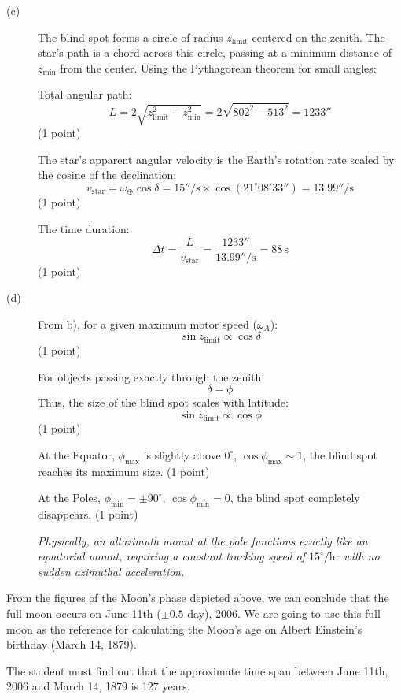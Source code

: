 \begin{description}
\item[(c)] The blind spot forms a circle of radius $z_{\mathrm{limit}}$
  centered on the zenith. The star's path is a chord across this circle,
  passing at a minimum distance of $z_{\mathrm{min}}$ from the center. Using
  the Pythagorean theorem for small angles:

  Total angular path:
  \[ L = 2\sqrt{z_{\mathrm{limit}}^2 - z_{\mathrm{min}}^2}
       = 2\sqrt{802^2 - 513^2} = 1233'' \]
  \hfill(1 point)

  The star's apparent angular velocity is the Earth's rotation rate scaled by
  the cosine of the declination:
  \[ v_{\mathrm{star}} = \omega_\oplus \cos\delta
     = 15''/\mathrm{s} \times \cos(21^\circ 08' 33'') = 13.99''/\mathrm{s} \]
  \hfill(1 point)

  The time duration:
  \[ \Delta t = \frac{L}{v_{\mathrm{star}}}
     = \frac{1233''}{13.99''/\mathrm{s}} = 88\,\mathrm{s} \]
  \hfill(1 point)

\item[(d)] From b), for a given maximum motor speed ($\omega_A$):
  \[ \sin z_{\mathrm{limit}} \propto \cos\delta \]
  \hfill(1 point)

  For objects passing exactly through the zenith:
  \[ \delta = \phi \]
  Thus, the size of the blind spot scales with latitude:
  \[ \sin z_{\mathrm{limit}} \propto \cos\phi \]
  \hfill(1 point)

  At the Equator, $\phi_{\mathrm{max}}$ is slightly above $0^\circ$,
  $\cos\phi_{\mathrm{max}} \sim 1$, the blind spot reaches its maximum size.
  \hfill(1 point)

  At the Poles, $\phi_{\mathrm{min}} = \pm 90^\circ$,
  $\cos\phi_{\mathrm{min}} = 0$, the blind spot completely disappears.
  \hfill(1 point)

  \textit{Physically, an altazimuth mount at the pole functions exactly like
  an equatorial mount, requiring a constant tracking speed of
  $15^\circ/\mathrm{hr}$ with no sudden azimuthal acceleration.}
\end{description}

From the figures of the Moon's phase depicted above, we can conclude that the
full moon occurs on June 11th ($\pm 0.5$ day), 2006. We are going to use this
full moon as the reference for calculating the Moon's age on Albert Einstein's
birthday (March 14, 1879).

The student must find out that the approximate time span between June 11th,
2006 and March 14, 1879 is 127 years.


